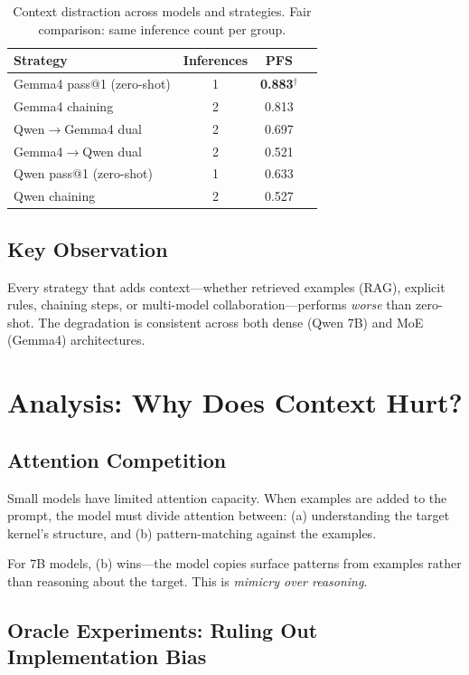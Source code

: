 \documentclass[11pt]{article}
\begin{document}
\begin{table}[t]
\centering
\caption{Context distraction across models and strategies.
Fair comparison: same inference count per group.}
\label{tab:models}
\begin{tabular}{lccc}
\toprule
\textbf{Strategy} & \textbf{Inferences} & \textbf{PFS} \\
\midrule
Gemma4 pass@1 (zero-shot)   & 1 & \textbf{0.883}$^\dagger$ \\
Gemma4 chaining              & 2 & 0.813 \\
Qwen$\to$Gemma4 dual         & 2 & 0.697 \\
Gemma4$\to$Qwen dual         & 2 & 0.521 \\
Qwen pass@1 (zero-shot)      & 1 & 0.633 \\
Qwen chaining                & 2 & 0.527 \\
\bottomrule
\end{tabular}
\end{table}

\subsection{Key Observation}

Every strategy that adds context---whether retrieved examples (RAG),
explicit rules, chaining steps, or multi-model collaboration---performs
\emph{worse} than zero-shot. The degradation is consistent across
both dense (Qwen 7B) and MoE (Gemma4) architectures.

\section{Analysis: Why Does Context Hurt?}

\subsection{Attention Competition}

Small models have limited attention capacity. When examples are added
to the prompt, the model must divide attention between:
(a) understanding the target kernel's structure, and
(b) pattern-matching against the examples.

For 7B models, (b) wins---the model copies surface patterns from
examples rather than reasoning about the target. This is
\emph{mimicry over reasoning}.

\subsection{Oracle Experiments: Ruling Out Implementation Bias}
\end{document}
